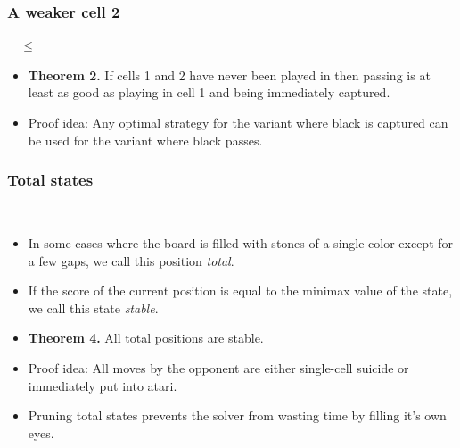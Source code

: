 \documentclass{beamer}
\begin{document}
    \begin{frame}
        \frametitle{A weaker cell 2}
        \begin{center}
            \cleargoban
            \showgoban[b2,k2]\ \ $\leq$
            \cleargoban
            \showgoban[b2,k2]
        \end{center}
        \begin{itemize}
            \item \textbf{Theorem 2.} If cells 1 and 2 have never been played
                in then passing is at least as good as playing in cell 1 and being immediately captured.
            \pause
            \item Proof idea: Any optimal strategy for the variant where black is captured can be used for the variant where black passes.
        \end{itemize}
    \end{frame}

    \begin{frame}
        \frametitle{Total states}
        \begin{center}
            \cleargoban
            \showgoban[b2,o2]\\\medskip
            \cleargoban
            \showgoban[b2,o2]
        \end{center}
        \begin{itemize}
            \item In some cases where the board is filled with stones of a single color
                except for a few gaps, we call this position \textit{total}.
            \item If the score of the current position is equal to the minimax value of the state,
                we call this state \textit{stable}.
            \pause
            \item \textbf{Theorem 4.} All total positions are stable.
            \item Proof idea: All moves by the opponent are either single-cell suicide or immediately put into atari.
            \item Pruning total states prevents the solver from wasting time by filling it's own eyes.
        \end{itemize}
    \end{frame}
\end{document}
